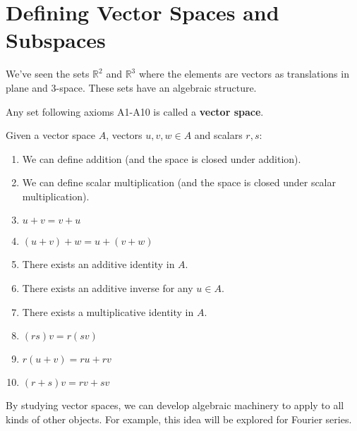 \documentclass[../main.tex]{subfiles}
\begin{document}
\section{Defining Vector Spaces and Subspaces}

We've seen the sets \( \mathbb{R}^2 \) and \( \mathbb{R}^3 \)
where the elements are vectors as translations in plane and 3-space.
These sets have an algebraic structure.

\begin{definition}
    Any set following axioms A1-A10 is called a \textbf{vector space}.

    Given a vector space \( A \), vectors \( u,v,w \in A \) and scalars \( r,s \):
    \begin{enumerate}[label=A\arabic*.]
        \item We can define addition (and the space is closed under addition).
        \item We can define scalar multiplication (and the space is closed under scalar multiplication).
        \item \( u+v = v+u \)
        \item \( (u+v)+w = u+(v+w) \)
        \item There exists an additive identity in \( A \).
        \item There exists an additive inverse for any \( u \in A \).
        \item There exists a multiplicative identity in \( A \).
        \item \( (rs)v = r(sv) \)
        \item \( r(u+v) = ru + rv \)
        \item \( (r+s)v = rv + sv \)
    \end{enumerate}
\end{definition}

By studying vector spaces, we can develop algebraic machinery to apply to all kinds of other objects.
For example, this idea will be explored for Fourier series.
\end{document}

